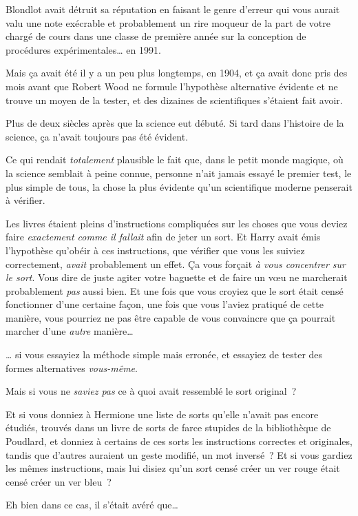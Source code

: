 Blondlot avait détruit sa réputation en faisant le genre d'erreur qui vous aurait valu une note exécrable et probablement un rire moqueur de la part de votre chargé de cours dans une classe de première année sur la conception de procédures expérimentales… en 1991.

Mais ça avait été il y a un peu plus longtemps, en 1904, et ça avait donc pris des mois avant que Robert Wood ne formule l'hypothèse alternative évidente et ne trouve un moyen de la tester, et des dizaines de scientifiques s'étaient fait avoir.

Plus de deux siècles après que la science eut débuté. Si tard dans l'histoire de la science, ça n'avait toujours pas été évident.

Ce qui rendait \emph{totalement} plausible le fait que, dans le petit monde magique, où la science semblait à peine connue, personne n'ait jamais essayé le premier test, le plus simple de tous, la chose la plus évidente qu'un scientifique moderne penserait à vérifier.

Les livres étaient pleins d'instructions compliquées sur les choses que vous deviez faire \emph{exactement comme il fallait} afin de jeter un sort. Et Harry avait émis l'hypothèse qu'obéir à ces instructions, que vérifier que vous les suiviez correctement, \emph{avait} probablement un effet. Ça vous forçait \emph{à vous concentrer sur le sort}. Vous dire de juste agiter votre baguette et de faire un vœu ne marcherait probablement \emph{pas} aussi bien. Et une fois que vous croyiez que le sort était censé fonctionner d'une certaine façon, une fois que vous l'aviez pratiqué de cette manière, vous pourriez ne pas être capable de vous convaincre que ça pourrait marcher d'une \emph{autre} manière…

… si vous essayiez la méthode simple mais erronée, et essayiez de tester des formes alternatives \emph{vous-même}.

Mais si vous ne \emph{saviez pas} ce à quoi avait ressemblé le sort original~?

Et si vous donniez à Hermione une liste de sorts qu'elle n'avait pas encore étudiés, trouvés dans un livre de sorts de farce stupides de la bibliothèque de Poudlard, et donniez à certains de ces sorts les instructions correctes et originales, tandis que d'autres auraient un geste modifié, un mot inversé~? Et si vous gardiez les mêmes instructions, mais lui disiez qu'un sort censé créer un ver rouge était censé créer un ver bleu~?

Eh bien dans ce cas, il s'était avéré que…

